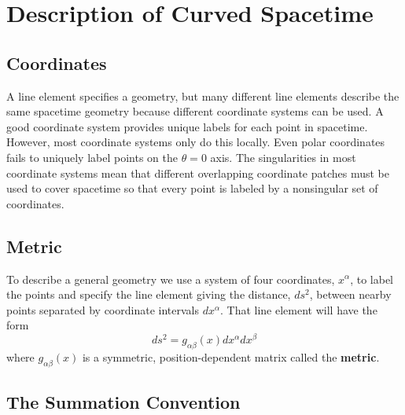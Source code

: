 %
%
%
\chapter{Description of Curved Spacetime}
\label{CurvSpac} %




\section{Coordinates}
\label{sec:Coord}


A line element specifies a geometry, but many different line elements describe the same spacetime geometry because different coordinate systems can be used. A good coordinate system provides unique labels for each point in spacetime. However, most coordinate systems only do this locally. Even polar coordinates fails to uniquely label points on the $\theta = 0$ axis. The singularities in most coordinate systems mean that different overlapping coordinate patches must be used to cover spacetime so that every point is labeled by a nonsingular set of coordinates.


\section{Metric}
\label{sec:metRic}

To describe a general geometry we use a system of four coordinates, $x^{\alpha}$, to label the points and specify the line element giving the distance, $ds^2$, between nearby points separated by coordinate intervals $dx^{\alpha}$. That line element will have the form \begin{equation*}
    \boxed{ds^2 = g_{\alpha\beta}(x)dx^{\alpha}dx^{\beta}}
\end{equation*}
where $g_{\alpha\beta}(x)$ is a symmetric, position-dependent matrix called the \textbf{metric}.


\section{The Summation Convention}
\label{sec:summConv}

